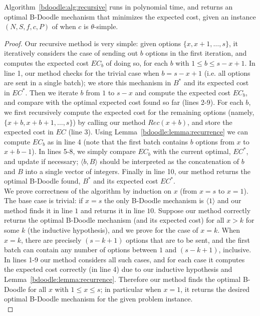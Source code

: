 	\begin{theorem} \label{bdoodle:thm:recursive_algo}
	Algorithm~\ref{bdoodle:alg:recursive} runs in polynomial time, and returns an optimal B-Doodle mechanism that minimizes the expected cost, given an instance $(N, S, f, c, P)$ of \BDPs when $c$ is $\theta$-simple.
	\end{theorem}
	\begin{proof}
	Our recursive method is very simple: given options $\{x, x+1, \dots, s\}$, it iteratively considers the case of sending out $b$ options in the first iteration, and computes the expected cost $EC_b$ of doing so, for each $b$ with $1 \leq b \leq s-x+1$.  In line 1, our method checks for the trivial case when $b = s-x+1$ (i.e. all options are sent in a single batch); we store this mechanism in $B^*$ and its expected cost in $EC^*$. Then we iterate $b$ from $1$ to $s-x$ and compute the expected cost $EC_b$, and compare with the optimal expected cost found so far (lines 2-9). For each $b$, we first recursively compute the expected cost for the remaining options (namely, $\{x+b, x+b+1, \dots, s\}$) by calling our method $Rec(x+b)$, and store the expected cost in $EC$ (line 3). Using Lemma~\ref{bdoodle:lemma:recurrence} we can compute $EC_b$ as in line 4 (note that the first batch contains $b$ options from $x$ to $x+b-1$). In lines 5-8, we simply compare $EC_b$ with the current optimal, $EC^*$, and update if necessary; $\langle b, B \rangle$ should be interpreted as the concatenation of $b$ and $B$ into a single vector of integers. Finally in line 10, our method returns the optimal B-Doodle found, $B^*$ and its expected cost $EC^*$. \\

	We prove correctness of the algorithm by induction on $x$ (from $x = s$ to $x = 1$). The base case is trivial: if $x = s$ the only B-Doodle mechanism is $\langle 1 \rangle$ and our method finds it in line $1$ and returns it in line $10$. Suppose our method correctly returns the optimal B-Doodle mechanism (and its expected cost) for all $x > k$ for some $k$ (the inductive hypothesis), and we prove for the case of $x = k$. When $x = k$, there are precisely $(s-k+1)$ options that are to be sent, and the first batch can contain any number of options between $1$ and $(s-k+1)$, inclusive. In lines 1-9 our method considers all such cases, and for each case it computes the expected cost correctly (in line 4) due to our inductive hypothesis and Lemma~\ref{bdoodle:lemma:recurrence}. Therefore our method finds the optimal B-Doodle for all $x$ with $1 \leq x \leq s$; in particular when $x = 1$, it returns the desired optimal B-Doodle mechanism for the given problem instance.\\


\end{proof}
